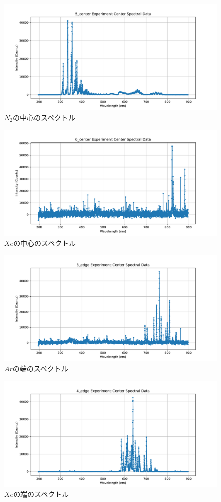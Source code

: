 \documentclass[a4j,twocolumn]{jsarticle}
\begin{document}
\begin{figure}[htb]
    \centering
    \includegraphics[keepaspectratio,width=0.6\columnwidth]{fig/5_center(N2).pdf}
    \caption{$N_2$の中心のスペクトル}
\end{figure}
\begin{figure}[htb]
    \centering
    \includegraphics[keepaspectratio,width=0.6\columnwidth]{fig/6_center(Xe).pdf}
    \caption{$Xe$の中心のスペクトル}
\end{figure}

\begin{figure}[htb]
    \centering
    \includegraphics[keepaspectratio,width=0.6\columnwidth]{fig/3_edge(Ar).pdf}
    \caption{$Ar$の端のスペクトル}
\end{figure}
\begin{figure}[htb]
    \centering
    \includegraphics[keepaspectratio,width=0.6\columnwidth]{fig/4_edge(Ne).pdf}
    \caption{$Xe$の端のスペクトル}
\end{figure}
\end{document}
